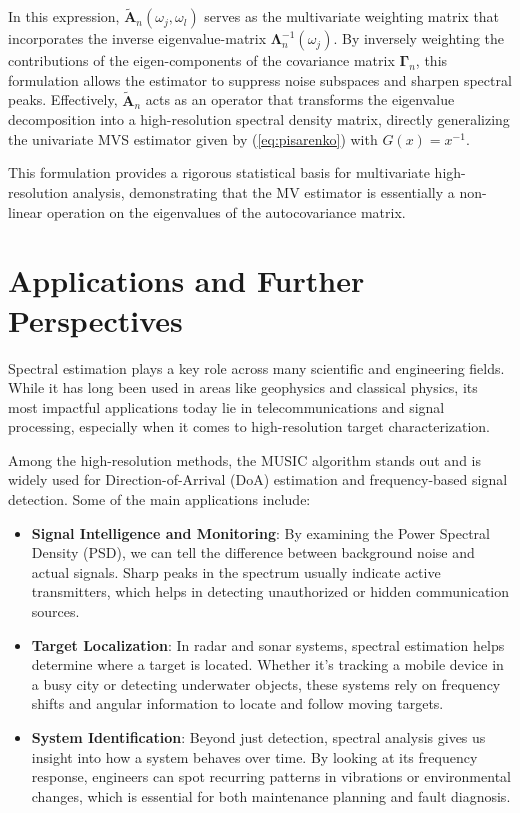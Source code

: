 \documentclass[twoside]{article}
\begin{document}
In this expression, $\widetilde{\mathbf{A}}_n(\omega_j, \omega_l)$ serves as the multivariate weighting matrix that incorporates the inverse eigenvalue-matrix $\mathbf{\Lambda}_n^{-1}(\omega_j)$. By inversely weighting the contributions of the eigen-components of the covariance matrix $\mathbf{\Gamma}_n$, this formulation allows the estimator to suppress noise subspaces and sharpen spectral peaks. Effectively, $\widetilde{\mathbf{A}}_n$ acts as an operator that transforms the eigenvalue decomposition into a high-resolution spectral density matrix, directly generalizing the univariate MVS estimator given by (\ref{eq:pisarenko}) with $G(x) = x^{-1}$.



This formulation provides a rigorous statistical basis for multivariate high-resolution analysis, demonstrating that the MV estimator is essentially a non-linear operation on the eigenvalues of the autocovariance matrix.



\section{Applications and Further Perspectives}



Spectral estimation plays a key role across many scientific and engineering fields. While it has long been used in areas like geophysics and classical physics, its most impactful applications today lie in telecommunications and signal processing, especially when it comes to high-resolution target characterization.



Among the high-resolution methods, the MUSIC algorithm stands out and is widely used for Direction-of-Arrival (DoA) estimation and frequency-based signal detection. Some of the main applications include:



\begin{itemize}
\item \textbf{Signal Intelligence and Monitoring}: By examining the Power Spectral Density (PSD), we can tell the difference between background noise and actual signals. Sharp peaks in the spectrum usually indicate active transmitters, which helps in detecting unauthorized or hidden communication sources.
\item \textbf{Target Localization}: In radar and sonar systems, spectral estimation helps determine where a target is located. Whether it's tracking a mobile device in a busy city or detecting underwater objects, these systems rely on frequency shifts and angular information to locate and follow moving targets.
\item \textbf{System Identification}: Beyond just detection, spectral analysis gives us insight into how a system behaves over time. By looking at its frequency response, engineers can spot recurring patterns in vibrations or environmental changes, which is essential for both maintenance planning and fault diagnosis.
\end{itemize}
\end{document}
